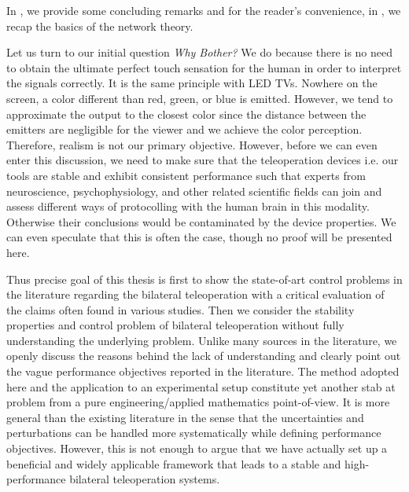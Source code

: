 In , we provide some concluding remarks and for the reader's convenience, in , we recap the basics of the network theory.

Let us turn to our initial question \emph{Why Bother?} We do because there is no need to obtain the ultimate perfect touch sensation for the human in order to interpret the signals correctly. It is the same principle with LED TVs. Nowhere on the screen, a color different than red, green, or blue is emitted. However, we tend to approximate the output to the closest color since the distance between the emitters are negligible for the viewer and we achieve the color perception. Therefore, realism is not our primary objective. However, before we can even enter this discussion, we need to make sure that the teleoperation devices i.e. our tools are stable and exhibit consistent performance such that experts from neuroscience, psychophysiology, and other related scientific fields can join and assess different ways of protocolling with the human brain in this modality. Otherwise their conclusions would be contaminated by the device properties. We can even speculate that this is often the case, though no proof will be presented here.  


Thus precise goal of this thesis is first to show the state-of-art control problems in the literature regarding the bilateral teleoperation with a critical evaluation of the claims often found in various studies. Then we consider the stability properties and control problem of bilateral teleoperation without fully understanding the underlying problem. Unlike many sources in the literature, we openly discuss the reasons behind the lack of understanding and clearly point out the vague performance objectives reported in the literature. The method adopted here and the application to an experimental setup constitute yet another stab at problem from a pure engineering/applied mathematics point-of-view. It is more general than the existing literature in the sense that the uncertainties and perturbations can be handled more systematically while defining performance objectives. However, this is not enough to argue that we have actually set up a beneficial and widely applicable framework that leads to a stable and high-performance bilateral teleoperation systems. 
